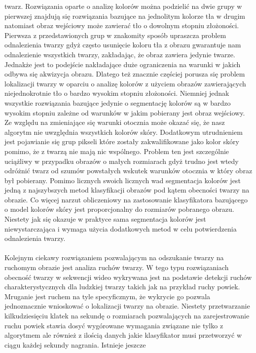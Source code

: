 twarz. Rozwiązania oparte o analizę kolorów można podzielić na dwie grupy w
pierwszej znajdują się rozwiązania bazujące na jednolitym kolorze tła w drugim
natomiast obraz wejściowy może zawierać tło o dowolnym stopniu złożoności.
Pierwsza z przedstawionych grup w znakomity sposób upraszcza problem odnalezienia
twarzy gdyż często usunięcie koloru tła z obrazu gwarantuje nam odnalezienie
wszystkich twarzy, zakładając, że obraz zawiera jedynie twarze. Jednakże jest to
podejście nakładające duże ograniczenia na warunki w jakich odbywa się akwizycja
obrazu. Dlatego też znacznie częściej porusza się problem lokalizacji twarzy w
oparciu o analizę kolorów z użyciem obrazów zawierających niejednokrotnie tło o
bardzo wysokim stopniu złożoności. Niemniej jednak wszystkie rozwiązania bazujące
jedynie o segmentację kolorów są w bardzo wysokim stopniu zależne od warunków w
jakim pobierany jest obraz wejściowy. Ze względu na zmieniające się warunki
otocznia może okazać się, że nasz algorytm nie uwzględnia wszystkich kolorów
skóry. Dodatkowym utrudnieniem jest pojawianie się grup pikseli które zostały
zakwalifikowane jako kolor skóry pomimo, że z twarzą nie mają nic wspólnego.
Problem ten jest szczególnie uciążliwy w przypadku obrazów o małych rozmiarach
gdyż trudno jest wtedy odróżnić twarz od szumów powstałych wskutek warunków
otocznia w który obraz był pobierany. Pomimo licznych swoich licznych wad
segmentacja kolorów jest jedną z najszybszych metod klasyfikacji obrazów pod
kątem obecności twarzy na obrazie. Co więcej narzut obliczeniowy na zastosowanie
klasyfikatora bazującego o model kolorów skóry jest proporcjonalny do rozmiarów
pobranego obrazu. Niestety jak się okazuje w praktyce sama segmentacja kolorów
jest niewystarczająca i wymaga
użycia dodatkowych metod w celu potwierdzenia odnalezienia twarzy. \\
\\
Kolejnym ciekawy rozwiązaniem pozwalającym na odszukanie twarzy na ruchomym
obrazie jest analiza ruchów twarzy. W tego typu rozwiązaniach obecność twarzy w
sekwencji wideo wykrywana jest na podstawie detekcji ruchów charakterystycznych
dla ludzkiej twarzy takich jak na przykład ruchy powiek. Mruganie jest ruchem na
tyle specyficznym, że wykrycie go pozwala jednoznacznie wnioskować o
lokalizacji twarzy na obrazie. Niestety przetwarzanie kilkudziesięciu klatek na sekundę o
rozmiarach pozwalających na zarejestrowanie ruchu powiek stawia dosyć wygórowane
wymagania związane nie tylko z algorytmem ale również z ilością danych jakie
klasyfikator musi przetworzyć w ciągu każdej sekundy nagrania. Istnieje jeszcze
